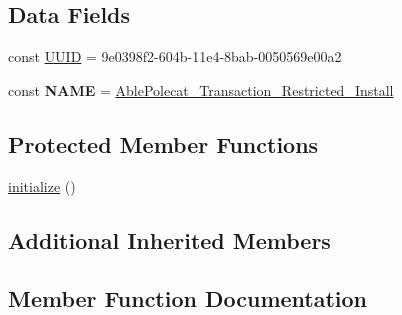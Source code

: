 \subsection*{Data Fields}
\begin{DoxyCompactItemize}
\item 
const \hyperlink{class_able_polecat___transaction___restricted___install_a74b892c8c0b86bf9d04c5819898c51e7}{U\+U\+I\+D} = \textquotesingle{}9e0398f2-\/604b-\/11e4-\/8bab-\/0050569e00a2\textquotesingle{}
\item 
\hypertarget{class_able_polecat___transaction___restricted___install_a244352f035b82b20b0efa506167fd862}{}const {\bfseries N\+A\+M\+E} = \textquotesingle{}\hyperlink{class_able_polecat___transaction___restricted___install}{Able\+Polecat\+\_\+\+Transaction\+\_\+\+Restricted\+\_\+\+Install}\textquotesingle{}\label{class_able_polecat___transaction___restricted___install_a244352f035b82b20b0efa506167fd862}

\end{DoxyCompactItemize}
\subsection*{Protected Member Functions}
\begin{DoxyCompactItemize}
\item 
\hyperlink{class_able_polecat___transaction___restricted___install_a91098fa7d1917ce4833f284bbef12627}{initialize} ()
\end{DoxyCompactItemize}
\subsection*{Additional Inherited Members}


\subsection{Member Function Documentation}
\hypertarget{class_able_polecat___transaction___restricted___install_abd12d28cbfdd5a45fba85bbac51a0b12}{}
